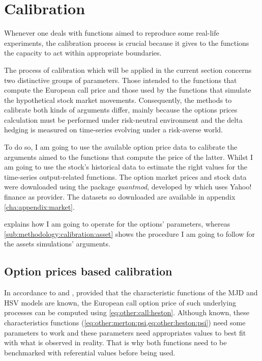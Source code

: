 \documentclass[12pt]{report}
\begin{document}
\section{Calibration}
\label{sec:methodology:calibration}

Whenever one deals with functions aimed to reproduce some real-life experiments, the calibration process is crucial because it gives to the functions the capacity to act within appropriate boundaries.

The process of calibration which will be applied in the current section concerns two distinctive groups of parameters. 
Those intended to the functions that compute the European call price and those used by the functions that simulate the hypothetical stock market movements.
Consequently, the methods to calibrate both kinds of arguments differ, mainly because the options prices calculation must be performed under risk-neutral environment and the delta hedging is measured on time-series evolving under a risk-averse world.

To do so, I am going to use the available option price data to calibrate the arguments aimed to the functions that compute the price of the latter. 
Whilst I am going to use the stock's historical data to estimate the right values for the time-series output-related functions.
The option market prices and stock data were downloaded using the package \textit{quantmod}, developed by \citet{quantmod} which uses Yahoo! finance as provider. The datasets so downloaded are available in appendix \ref{cha:appendix:market}.

 explains how I am going to operate for the options' parameters, whereas \cref{sub:methodology:calibration:asset} shows the procedure I am going to follow for the assets simulations' arguments.


\subsection{Option prices based calibration}
\label{sub:methodology:calibration:option}

In accordance to \citet{heston1993} and \citet{criso2015}, provided that the characteristic functions of the MJD and HSV models are known, the European call option price of such underlying processes can be computed using \cref{eq:other:call:heston}.
Although known, these characteristics functions (\cref{eq:other:merton:psi,eq:other:heston:psi}) need some parameters to work and these parameters need appropriates values to best fit with what is observed in reality.
That is why both functions need to be benchmarked with referential values before being used.
\end{document}
